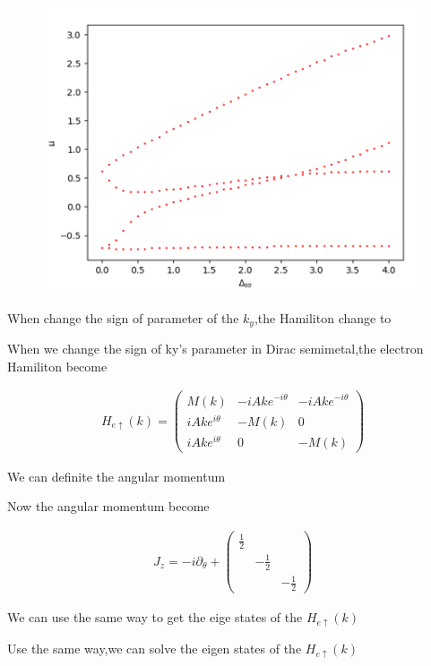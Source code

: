 \documentclass[4pt]{article}
\begin{document}
\begin{figure}[H]
	\centering
	\includegraphics[scale=0.6]{figure/5}
\end{figure}

When change the sign of parameter of the $k_y$,the Hamiliton change to

When we change the sign of ky's parameter in Dirac semimetal,the electron Hamiliton become

\begin{align}
	H_{e\uparrow}(k)=
	\begin{pmatrix}
		M(k) & -iAke^{-i\theta}&-iAke^{-i\theta}\\
		iAke^{i\theta}&-M(k)&0\\
		iAke^{i\theta}&0&-M(k)
	\end{pmatrix}
\end{align}

We can definite the angular momentum

Now the angular momentum become

\begin{align}
	J_z=-i\partial_{\theta}+\begin{pmatrix}
		\frac{1}{2}&&\\
		&-\frac{1}{2}&\\
		&&-\frac{1}{2}
	\end{pmatrix}
\end{align}

We can use the same way to get the eige states of the $H_{e\uparrow}(k)$

Use the same way,we can solve the eigen states of the $H_{e\uparrow}(k)$
\end{document}
